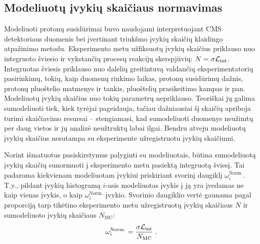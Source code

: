 \documentclass[a4paper, 12pt, oneside]{article}
\newcommand{\Lumi}{{\cal L}_\mathrm{int}}
\newlength\q
\begin{document}
\subsection{Modeliuotų įvykių skaičiaus normavimas}
Modeliuoti protonų susidūrimai buvo naudojami interpretuojant CMS detektoriaus duomenis bei įvertinant triukšmo įvykių
skaičių klaidingo atpažinimo metodu.
Eksperimento metu užfiksuotų įvykių skaičius priklauso nuo integruoto šviesio ir vykstančių procesų reakcijų skerspjūvių:
$N = \sigma\Lumi$.
Integruotas šviesis priklauso nuo dalelių greitintuvą valdančių eksperimentatorių pasirinkimų, tokių, kaip duomenų rinkimo laikas,
protonų susidūrimų dažnis, protonų pluoštelio matmenys ir tankis, pluoštelių prasikeitimo kampas ir pan.
Modeliuotų įvykių skaičius nuo tokių parametrų nepriklauso.
Teoriškai jų galima sumodeliuoti tiek, kiek tyrėjai pageidauja, tačiau dažniausiai šį skaičių apriboja turimi skaičiavimo
resursai -- stengiamasi, kad sumodeliuoti duomenys neužimtų per daug vietos ir jų analizė neužtruktų labai ilgai.
Bendru atveju modeliuotų įvykių skaičius nesutampa su eksperimente užregistruotu įvykių skaičiumi.

Norint išmatuotus pasiskirstymus palyginti su modeliuotais, būtina sumodeliuotą įvykių skaičių sunormuoti į eksperimento
metu pasiektą integruotą šviesį.
Tai padaroma kiekvienam modeliuotam įvykiui priskiriant svorinį daugiklį $\omega_{i}^{\mathrm{Norm.}}$.
T.y., pildant įvykių histogramą $i$-asis modeliuotas įvykis į ją yra įvedamas ne kaip vienas įvykis, o kaip
$\omega_{i}^{\mathrm{Norm.}}$ įvykio.
Svorinio daugiklio vertė gaunama pagal proporciją tarp tikėtino eksperimento metu užregistruotų įvykių skaičiaus $N$ ir
sumodeliuoto įvykių skaičiaus $N_{\mathrm{MC}}$:
\begin{equation}
	\label{eq:LOweight}
	\omega_{i}^{\mathrm{Norm.}} = \frac{ \sigma\Lumi }{ N_{\mathrm{MC}} } \; .
\end{equation}
\end{document}
